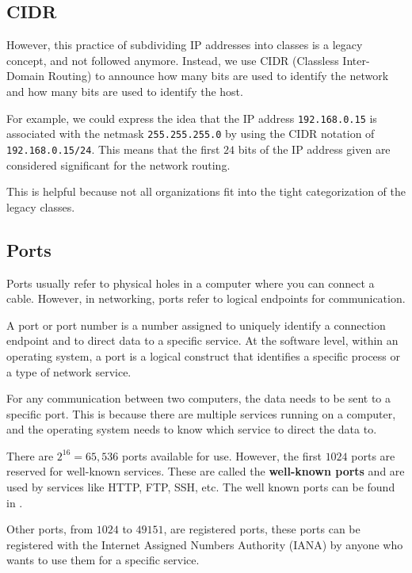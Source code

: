 \subsection{CIDR}

However, this practice of subdividing IP addresses
into classes is a legacy concept, and not followed
anymore. Instead, we use CIDR (Classless Inter-Domain
Routing) to announce how many bits are used to identify
the network and how many bits are used to identify the
host.

For example, we could express the idea that the IP address
\lstinline|192.168.0.15| is associated with the netmask
\lstinline|255.255.255.0| by using the CIDR notation of
\lstinline|192.168.0.15/24|. This means that the first
$24$ bits of the IP address given are considered
significant for the network routing.

This is helpful because not all organizations fit
into the tight categorization of the legacy classes.

\subsection{Ports}

Ports usually refer to physical holes in a computer
where you can connect a cable. However, in networking,
ports refer to logical endpoints for communication.

\begin{definition}[Port]
A port or port number is a number assigned to uniquely identify
a connection endpoint and to direct data to a specific service.
At the software level, within an operating system, a port is a
logical construct that identifies a specific process or a type
of network service.
\end{definition}

For any communication between two computers, the data
needs to be sent to a specific port. This is because
there are multiple services running on a computer, and
the operating system needs to know which service to
direct the data to.

There are $2^{16} = 65,536$ ports available for use.
However, the first $1024$ ports are reserved for
well-known services. These are called the \textbf{well-known
ports} and are used by services like HTTP, FTP, SSH, etc.
The well known ports can be found in .

Other ports, from $1024$ to $49151$, are registered ports,
these ports can be registered with the Internet Assigned
Numbers Authority (IANA) by anyone who wants to use them
for a specific service.

